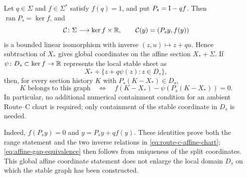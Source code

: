 \begin{lemma}
\label{lem:route-c-affine-splitting}
Let \(q\in\Sigma\) and \(f\in\Sigma^*\) satisfy \(f(q)=1\), and put
\(P_s=\mathrm I-qf\).  Then \(\operatorname{ran}P_s=\ker f\), and
\begin{equation}
 \mathcal C\colon\Sigma\longrightarrow\ker f\times\mathbb R,
 \qquad
 \mathcal C(y)=(P_sy,f(y))                              \label{eq:route-c-affine-chart}
\end{equation}
is a bounded linear isomorphism with inverse
\((z,u)\mapsto z+qu\).  Hence subtraction of \(X_*\) gives global
coordinates on the affine section \(X_*+\Sigma\).  If
\(\psi\colon D_s\subset\ker f\to\mathbb R\) represents the local stable sheet as
\begin{equation}
 X_*+\{z+q\psi(z):z\in D_s\},                          \label{eq:centered-stable-sheet}
\end{equation}
then, for every section history \(K\) with
\(P_s(K-X_*)\in D_s\),
\begin{equation}
 K\text{ belongs to this graph}
 \quad\Longleftrightarrow\quad
 f(K-X_*)-\psi(P_s(K-X_*))=0.                          \label{eq:affine-gap-equivalence}
\end{equation}
In particular, no additional numerical containment condition for an
ambient Route--C chart is required; only containment of the stable
coordinate in \(D_s\) is needed.
\end{lemma}

Indeed, \(f(P_sy)=0\) and \(y=P_sy+qf(y)\).  These identities prove both the
range statement and the two inverse relations in \cref{eq:route-c-affine-chart};
\cref{eq:affine-gap-equivalence} then follows from uniqueness of the split
coordinates.  This global affine coordinate statement does not enlarge the
local domain \(D_s\) on which the stable graph has been constructed.

